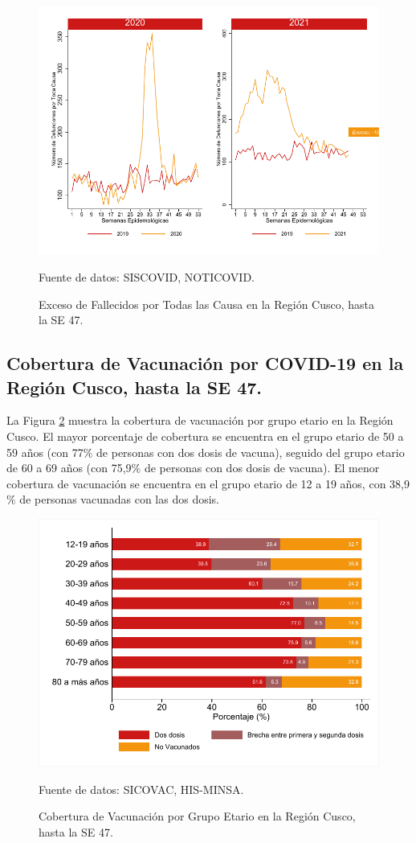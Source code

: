 \documentclass[12pt,a4paper,openany]{book}
\begin{document}
	\begin{figure}[h]
	\caption{Exceso de Fallecidos por  Todas las Causa en la Región Cusco,  hasta la SE 47.}\label{fig:exceso_regional}
	\begin{center}
		\includegraphics[width=0.85\linewidth]{../figuras/exceso_region.pdf}
	\end{center}
	{\footnotesize {Fuente de datos: SISCOVID, NOTICOVID.}}
	\end{figure}
\clearpage

	\subsection*{Cobertura de Vacunación por COVID-19 en la Región Cusco, hasta la SE 47.}
\noindent La Figura \ref{fig:vacuna_edad} muestra la cobertura de vacunación por grupo etario en la Región Cusco. El mayor porcentaje de cobertura se encuentra en el grupo etario de 50 a 59 años (con 77$\%$ de personas con dos dosis de vacuna), seguido del grupo etario de 60 a 69 años  (con 75,9$\%$ de personas con dos dosis de vacuna). El menor cobertura de vacunación se encuentra en el grupo etario de 12 a 19 años, con 38,9$\%$ de personas vacunadas con las dos dosis. 

\begin{figure}[h]
	\caption{Cobertura de Vacunación por Grupo Etario en la Región Cusco, hasta la SE 47. }\label{fig:vacuna_edad}
	\begin{center}
		\includegraphics[width=0.65\linewidth]{../figuras/vacunacion_grupo_edad.pdf}
	\end{center}
	{\footnotesize {Fuente de datos: SICOVAC, HIS-MINSA.}}
\end{figure}
\end{document}

